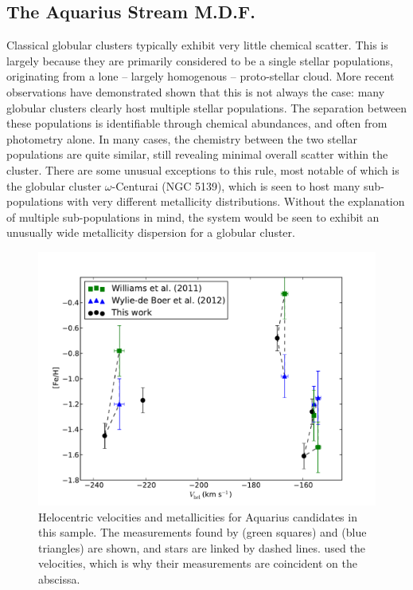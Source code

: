 \documentclass{emulateapj}
\begin{document}
\subsection{The Aquarius Stream M.D.F.}

Classical globular clusters typically exhibit very little chemical scatter. This is largely because they are primarily considered to be a single stellar populations, originating from a lone \--- largely homogenous \--- proto-stellar cloud. More recent observations have demonstrated shown that this is not always the case: many globular clusters clearly host multiple stellar populations. The separation between these populations is identifiable through chemical abundances, and often from photometry alone. In many cases, the chemistry between the two stellar populations are quite similar, still revealing minimal overall scatter within the cluster. There are some unusual exceptions to this rule, most notable of which is the globular cluster $\omega$-Centurai (NGC 5139), which is seen to host many sub-populations with very different metallicity distributions. Without the explanation of multiple sub-populations in mind, the system would be seen to exhibit an unusually wide metallicity dispersion for a globular cluster.

\begin{figure}[t!]
	\includegraphics[width=\textwidth]{./figures/aquarius-vhel-feh.pdf}
	\caption{Helocentric velocities and metallicities for Aquarius candidates in this sample. The measurements found by \citet{williams;et-al_2011} (green squares) and \citet{wylie-de-boer;et-al_2012} (blue triangles) are shown, and stars are linked by dashed lines. \citet{wylie-de-boer;et-al_2012} used the \citet{williams;et-al_2011} velocities, which is why their measurements are coincident on the abscissa.}
	\label{fig:aquarius-vhel-feh}
\end{figure}
\end{document}
